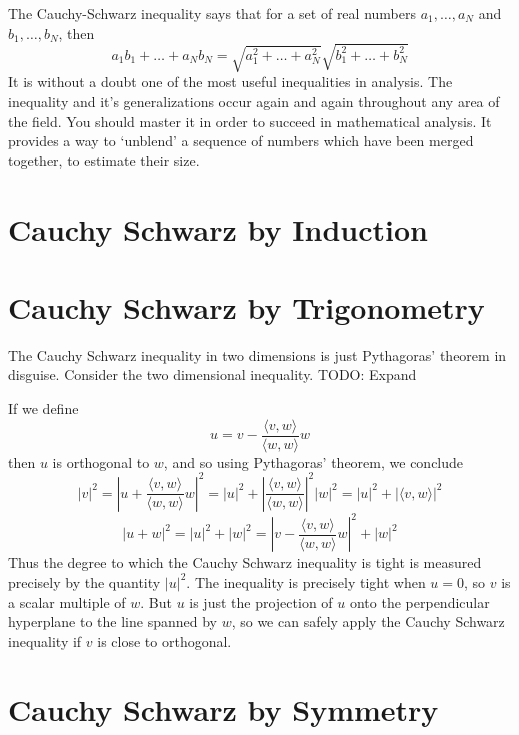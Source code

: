 The Cauchy-Schwarz inequality says that for a set of real numbers $a_1, \dots, a_N$ and $b_1, \dots, b_N$, then
%
\[ a_1b_1 + \dots + a_Nb_N = \sqrt{a_1^2 + \dots + a_N^2} \sqrt{b_1^2 + \dots + b_N^2} \]
%
It is without a doubt one of the most useful inequalities in analysis. The inequality and it's generalizations occur again and again throughout any area of the field. You should master it in order to succeed in mathematical analysis. It provides a way to `unblend' a sequence of numbers which have been merged together, to estimate their size.

\section{Cauchy Schwarz by Induction}

\section{Cauchy Schwarz by Trigonometry}

The Cauchy Schwarz inequality in two dimensions is just Pythagoras' theorem in disguise. Consider the two dimensional inequality. TODO: Expand

If we define
%
\[ u = v - \frac{\langle v, w \rangle}{\langle w, w \rangle} w \]
%
then $u$ is orthogonal to $w$, and so using Pythagoras' theorem, we conclude
%
\[ |v|^2 = \left| u + \frac{\langle v, w \rangle}{\langle w,w \rangle} w \right|^2 = |u|^2 + \left| \frac{\langle v,w \rangle}{\langle w,w \rangle} \right|^2 |w|^2 = |u|^2 + |\langle v, w \rangle|^2 \]
%
\[ |u + w|^2 = |u|^2 + |w|^2 = \left| v - \frac{\langle v, w \rangle}{\langle w, w \rangle} w \right|^2 + |w|^2 \]
%
Thus the degree to which the Cauchy Schwarz inequality is tight is measured precisely by the quantity $|u|^2$. The inequality is precisely tight when $u = 0$, so $v$ is a scalar multiple of $w$. But $u$ is just the projection of $u$ onto the perpendicular hyperplane to the line spanned by $w$, so we can safely apply the Cauchy Schwarz inequality if $v$ is close to orthogonal.

\section{Cauchy Schwarz by Symmetry}

